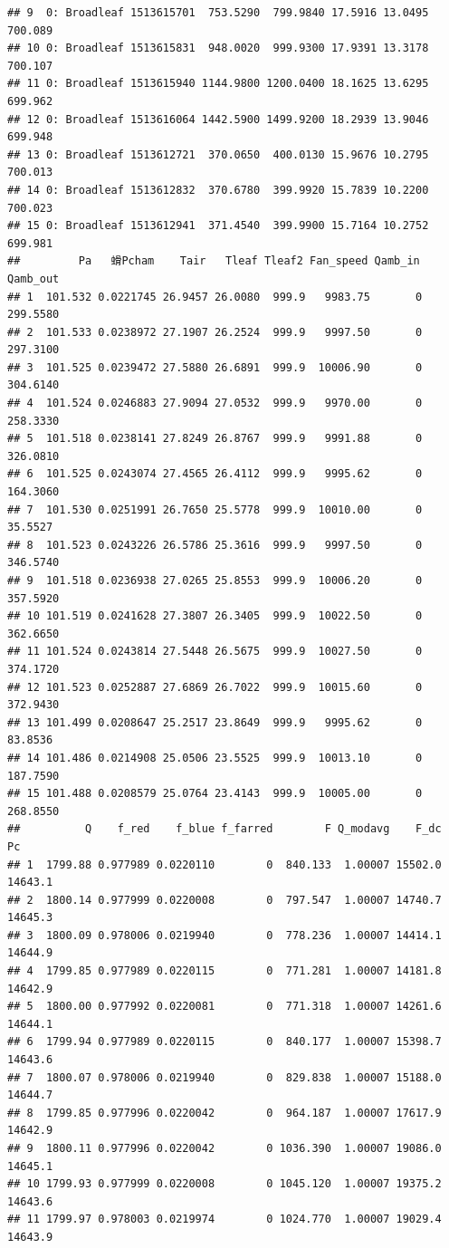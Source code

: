 \documentclass[]{krantz}
\theoremstyle{definition}
\theoremstyle{definition}
\theoremstyle{definition}
\theoremstyle{remark}
\begin{document}
\begin{verbatim}
## 9  0: Broadleaf 1513615701  753.5290  799.9840 17.5916 13.0495 700.089
## 10 0: Broadleaf 1513615831  948.0020  999.9300 17.9391 13.3178 700.107
## 11 0: Broadleaf 1513615940 1144.9800 1200.0400 18.1625 13.6295 699.962
## 12 0: Broadleaf 1513616064 1442.5900 1499.9200 18.2939 13.9046 699.948
## 13 0: Broadleaf 1513612721  370.0650  400.0130 15.9676 10.2795 700.013
## 14 0: Broadleaf 1513612832  370.6780  399.9920 15.7839 10.2200 700.023
## 15 0: Broadleaf 1513612941  371.4540  399.9900 15.7164 10.2752 699.981
##         Pa   螖Pcham    Tair   Tleaf Tleaf2 Fan_speed Qamb_in Qamb_out
## 1  101.532 0.0221745 26.9457 26.0080  999.9   9983.75       0 299.5580
## 2  101.533 0.0238972 27.1907 26.2524  999.9   9997.50       0 297.3100
## 3  101.525 0.0239472 27.5880 26.6891  999.9  10006.90       0 304.6140
## 4  101.524 0.0246883 27.9094 27.0532  999.9   9970.00       0 258.3330
## 5  101.518 0.0238141 27.8249 26.8767  999.9   9991.88       0 326.0810
## 6  101.525 0.0243074 27.4565 26.4112  999.9   9995.62       0 164.3060
## 7  101.530 0.0251991 26.7650 25.5778  999.9  10010.00       0  35.5527
## 8  101.523 0.0243226 26.5786 25.3616  999.9   9997.50       0 346.5740
## 9  101.518 0.0236938 27.0265 25.8553  999.9  10006.20       0 357.5920
## 10 101.519 0.0241628 27.3807 26.3405  999.9  10022.50       0 362.6650
## 11 101.524 0.0243814 27.5448 26.5675  999.9  10027.50       0 374.1720
## 12 101.523 0.0252887 27.6869 26.7022  999.9  10015.60       0 372.9430
## 13 101.499 0.0208647 25.2517 23.8649  999.9   9995.62       0  83.8536
## 14 101.486 0.0214908 25.0506 23.5525  999.9  10013.10       0 187.7590
## 15 101.488 0.0208579 25.0764 23.4143  999.9  10005.00       0 268.8550
##          Q    f_red    f_blue f_farred        F Q_modavg    F_dc      Pc
## 1  1799.88 0.977989 0.0220110        0  840.133  1.00007 15502.0 14643.1
## 2  1800.14 0.977999 0.0220008        0  797.547  1.00007 14740.7 14645.3
## 3  1800.09 0.978006 0.0219940        0  778.236  1.00007 14414.1 14644.9
## 4  1799.85 0.977989 0.0220115        0  771.281  1.00007 14181.8 14642.9
## 5  1800.00 0.977992 0.0220081        0  771.318  1.00007 14261.6 14644.1
## 6  1799.94 0.977989 0.0220115        0  840.177  1.00007 15398.7 14643.6
## 7  1800.07 0.978006 0.0219940        0  829.838  1.00007 15188.0 14644.7
## 8  1799.85 0.977996 0.0220042        0  964.187  1.00007 17617.9 14642.9
## 9  1800.11 0.977996 0.0220042        0 1036.390  1.00007 19086.0 14645.1
## 10 1799.93 0.977999 0.0220008        0 1045.120  1.00007 19375.2 14643.6
## 11 1799.97 0.978003 0.0219974        0 1024.770  1.00007 19029.4 14643.9

\end{verbatim}
\end{document}
